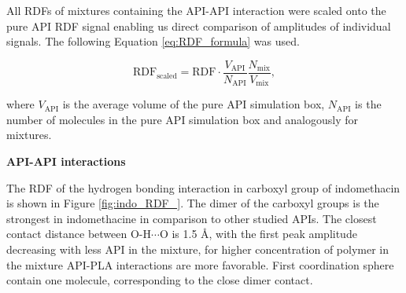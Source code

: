 All RDFs of mixtures containing the API-API interaction were scaled onto the pure API RDF signal enabling us direct comparison of amplitudes of individual signals. The following Equation \ref{eq:RDF_formula} was used.

\begin{equation}\label{eq:RDF_formula}
	\text{RDF}_{\text{scaled}} = \text{RDF} \cdot \frac{V_{\text{API}}}{N_{\text{API}}} \frac{N_{\text{mix}}}{V_{\text{mix}}},
\end{equation}

where $V_{\text{API}}$ is the average volume of the pure API simulation box, $N_{\text{API}}$ is the number of molecules in the pure API simulation box and analogously for mixtures.

\newpage
\textbf{API-API interactions}

The RDF of the hydrogen bonding interaction in carboxyl group of indomethacin is shown in Figure \ref{fig:indo_RDF_}. The dimer of the carboxyl groups is the strongest in indomethacine in comparison to other studied APIs. The closest contact distance between O-H$\cdots$O is 1.5 \AA, with the first peak amplitude decreasing with less API in the mixture, for higher concentration of polymer in the mixture API-PLA interactions are more favorable. First coordination sphere contain one molecule, corresponding to the close dimer contact.

